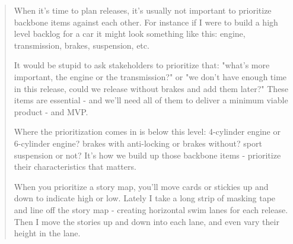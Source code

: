 \blockquote{When it's time to plan releases, it's usually not important to prioritize backbone items against each other. For instance if I were to build a high level backlog for a car it might look something like this: engine, transmission, brakes, suspension, etc.

It would be stupid to ask stakeholders to prioritize that: "what's more important, the engine or the transmission?" or "we don't have enough time in this release, could we release without brakes and add them later?" These items are essential - and we'll need all of them to deliver a minimum viable product - and MVP.

Where the prioritization comes in is below this level: 4-cylinder engine or 6-cylinder engine? brakes with anti-locking or brakes without? sport suspension or not? It's how we build up those backbone items - prioritize their characteristics that matters.

When you prioritize a story map, you'll move cards or stickies up and down to indicate high or low. Lately I take a long strip of masking tape and line off the story map - creating horizontal swim lanes for each release. Then I move the stories up and down into each lane, and even vary their height in the lane.}

